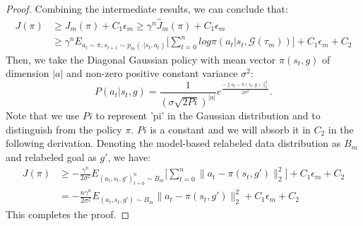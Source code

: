 \documentclass{article}
\begin{document}
\begin{proof}
Combining the intermediate results, we can conclude that:
\begin{equation*}
\begin{aligned}
    J(\pi) &\geq J_m(\pi) + C_1 \epsilon_m \geq \gamma^n \hat J_m(\pi) +  C_1 \epsilon_m \\
    & \geq \gamma^n E_{a_t \sim \pi, s_{t+1} \sim p_m(\cdot|s_t,a_t)} \big[ \sum_{t=0}^n log\pi(a_t|s_t,\mathcal{G}(\tau_m)) \big] + C_1 \epsilon_m + C_2
\end{aligned}
\end{equation*}
Then, we take the Diagonal Gaussian policy with mean vector $\pi(s_t,g)$ of dimension $|a|$ and non-zero positive constant variance $\sigma^2$:
\begin{equation*}
    P(a_t|s_t,g)=\frac{1}{(\sigma \sqrt{2Pi})^{|a|}} e^{\frac{-\|a_t-\pi(s_t,g)\|_2^2}{2\sigma^2}} .
\end{equation*}
Note that we use $Pi$ to represent 'pi' in the Gaussian distribution and to distinguish from the policy $\pi$. $Pi$ is a constant and we will absorb it in $C_2$ in the following derivation.
Denoting the model-based relabeled data distribution as $B_m$ and relabeled goal as $g'$, we have:
\begin{equation*}
    \begin{aligned}
    J(\pi) &\geq -\frac{\gamma^n}{2\sigma^2} E_{(a_t,s_t,g')^n_{t=0} \sim B_m} \big[ \sum_{t=0}^n \|a_t -\pi(s_t,g')\|_2^2 \big] + C_1 \epsilon_m + C_2 \\
    &= -\frac{n\gamma^n}{2\sigma^2} E_{(a_t,s_t,g') \sim B_m} \|a_t -\pi(s_t,g')\|_2^2  + C_1 \epsilon_m + C_2
    \end{aligned}
\end{equation*}
This completes the proof.
\end{proof}
\end{document}

